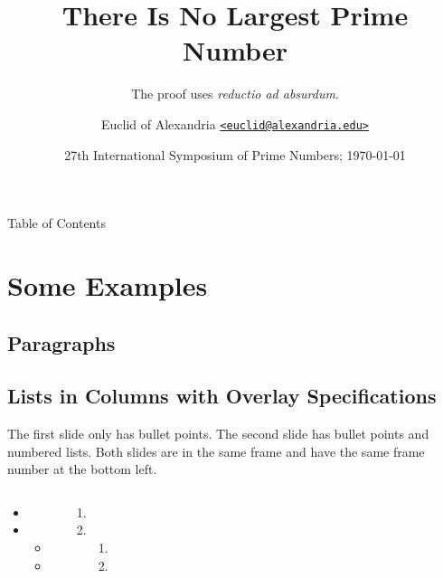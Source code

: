 \documentclass[aspectratio=169,xcolor={svgnames}]{beamer}
\title[Prime Numbers]{There Is No Largest Prime Number}
\subtitle[\textit{reductio ad absurdum}]
  {The proof uses \textit{reductio ad absurdum}.}
\author[Euclid of Alexandria]{Euclid of Alexandria
  \href{mailto:euclid@alexandria.edu}{\texttt{<euclid@alexandria.edu>}}}
\institute[Musaeum]{Musaeum of Alexandria}
\date[ISPN \the\year]{27th International Symposium of Prime Numbers; \today}
\begin{document}
\begin{frame}
  \titlepage
\end{frame}

\begin{frame}{Table of Contents}
  \tableofcontents
\end{frame}

\section{Some Examples}

\subsection{Paragraphs}
\begin{frame}{\insertsubsectionhead}
  \lipsum[1][1-5]

  \vspace{8pt}
  \lipsum[2][1-5]
\end{frame}

\subsection{Lists in Columns with Overlay Specifications}
\begin{frame}{\insertsubsectionhead}
The first slide only has bullet points. The second slide has bullet points and
numbered lists. Both slides are in the same frame and have the same frame
number at the bottom left.

  \begin{columns}[t]
    \begin{itemize}
      \item \lipsum[3][1]
      \item \lipsum[3][2]
      \begin{itemize}
        \item \lipsum[3][5]
        \item \lipsum[3][8]
      \end{itemize}
    \end{itemize}

    \begin{enumerate}
      \item<2-> \lipsum[3][3]
      \item<2-> \lipsum[3][4]
      \begin{enumerate}
        \item \lipsum[3][6]
        \item \lipsum[3][7]
      \end{enumerate}
    \end{enumerate}
  \end{columns}
\end{frame}
\end{document}
